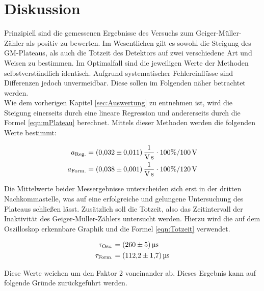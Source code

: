 %

%

\section{Diskussion}
\label{sec:Diskussion}

\noindent Prinzipiell sind die gemessenen Ergebnisse des Versuchs zum Geiger-Müller-Zähler als positiv zu bewerten. Im Wesentlichen 
gilt es sowohl die Steigung des GM-Plateaus, als auch die Totzeit des Detektors auf zwei verschiedene Art und Weisen zu bestimmen. 
Im Optimalfall sind die jeweiligen Werte der Methoden selbstverständlich identisch. Aufgrund systematischer Fehlereinflüsse
sind Differenzen jedoch unvermeidbar. Diese sollen im Folgenden näher betrachtet werden.\\

\noindent Wie dem vorherigen Kapitel \ref{sec:Auswertung} zu entnehmen ist, wird die Steigung einerseits durch eine lineare 
Regression und andererseits durch die Formel \eqref{eqn:mPlateau} berechnet. Mittels dieser Methoden werden die folgenden 
Werte bestimmt:

\begin{align*}
    a_\text{Reg.} &= \qty{0.032\pm0.011}{\per \volt \per \second} \cdot 100\% / \qty{100}{\volt}\\
    a_\text{Form.} &= \qty{0.038\pm0.001}{\per \volt \per \second} \cdot 100\% / \qty{120}{\volt}
\end{align*}

\noindent Die Mittelwerte beider Messergebnisse unterscheiden sich erst in der dritten Nachkommastelle, was auf eine erfolgreiche 
und gelungene Untersuchung des Plateaus schließen lässt. Zusätzlich soll die Totzeit, also das Zeitintervall der Inaktivität des 
Geiger-Müller-Zählers untersucht werden. Hierzu wird die auf dem Oszilloskop erkennbare Graphik und die Formel \eqref{eqn:Totzeit}
verwendet.

\begin{align*}
    \tau_\text{Osz.} &= \qty{260\pm5}{\micro \second}\\
    \tau_\text{Form.} &= \qty{112.2\pm1.7}{\micro \second}
\end{align*}

\noindent Diese Werte weichen um den Faktor 2 voneinander ab. Dieses Ergebnis kann auf folgende Gründe zurückgeführt werden. \\

